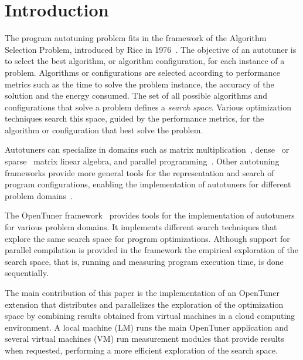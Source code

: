 \documentclass[a4paper, 12pt]{article}
\begin{document}
\section{Introduction} \label{sec:intro}


The program autotuning problem fits in the framework of the Algorithm Selection
Problem, introduced by Rice in 1976~\cite{rice1976algorithm}. The objective of
an autotuner is to select the best algorithm, or algorithm configuration, for
each instance of a problem.  Algorithms or configurations are selected
according to performance metrics such as the time to solve the problem
instance, the accuracy of the solution and the energy consumed.  The set of all
possible algorithms and configurations that solve a problem defines a
\emph{search space}. Various optimization techniques search this space, guided
by the performance metrics, for the algorithm or configuration that best solve
the problem.


Autotuners can specialize in domains such as matrix
multiplication~\cite{bilmes1997phipac}, dense~\cite{whaley1998atlas} or
sparse~\cite{vuduc2005oski} matrix linear algebra, and parallel
programming~\cite{jordan2012multi}. Other autotuning frameworks provide more
general tools for the representation and search of program configurations,
enabling the implementation of autotuners for different problem
domains~\cite{ansel2014opentuner,hutter2009paramils}.

The OpenTuner framework~\cite{ansel2014opentuner} provides tools for the
implementation of autotuners for various problem domains. It implements
different search techniques that explore the same search space for program
optimizations. Although support for parallel compilation is provided in the
framework the empirical exploration of the search space, that is, running and
measuring program execution time, is done sequentially. 

The main contribution of this paper is the implementation of an
OpenTuner extension that distributes and parallelizes the exploration of
the optimization space by combining results obtained from virtual machines
in a cloud computing environment. A local machine (LM) runs the main
OpenTuner application and several virtual machines (VM) run measurement
modules that provide results when requested, performing a more efficient
exploration of the search space.
\end{document}
